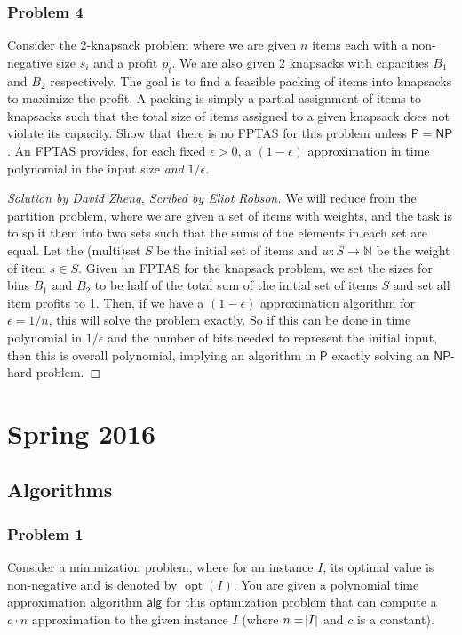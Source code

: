 \documentclass{article}
\newenvironment{scribed}[2]{\begin{proof}[Solution by #1, Scribed by #2]}{\end{proof}}
\newcommand{\NP}{\mathsf{NP}}
\newcommand{\Pe}{\mathsf{P}}
\newcommand{\Naturals}{\mathbb{N}}
\DeclareMathOperator{\opt}{opt}
\begin{document}
\subsubsection{Problem 4}
Consider the 2-knapsack problem where we are given \(n\) items each with a non-negative size \(s_i\) and a profit \(p_i\). We are also given 2 knapsacks with capacities \(B_1\) and \(B_2\) respectively. The goal is to find a feasible packing of items into knapsacks to maximize the profit. A packing is simply a partial assignment of items to knapsacks such that the total size of items assigned to a given knapsack does not violate its capacity. Show that there is no FPTAS for this problem unless \(\Pe = \NP\). An FPTAS provides, for each fixed \(\epsilon > 0\), a \((1 - \epsilon)\) approximation in time polynomial in the input size \emph{and} \(1 / \epsilon\).


\begin{scribed}{David Zheng}{Eliot Robson}
	We will reduce from the partition problem, where we are given a set of items with weights, and the task is to split them into two sets such that the sums of the elements in each set are equal. Let the (multi)set \(S\) be the initial set of items and \(w : S \to \Naturals\) be the weight of item \(s \in S\). Given an FPTAS for the knapsack problem, we set the sizes for bins \(B_1\) and \(B_2\) to be half of the total sum of the initial set of items \(S\) and set all item profits to 1. Then, if we have a \((1 - \epsilon)\) approximation algorithm for \(\epsilon = 1/n\), this will solve the problem exactly. So if this can be done in time polynomial in \(1/\epsilon\) and the number of bits needed to represent the initial input, then this is overall polynomial, implying an algorithm in \(\Pe\) exactly solving an \(\NP\)-hard problem.
\end{scribed}

\section{Spring 2016}

\subsection{Algorithms}

\subsubsection{Problem 1}
Consider a minimization problem, where for an instance \(I\), its optimal value is non-negative and is denoted by \(\opt(I)\). You are given a polynomial time approximation algorithm \(\mathsf{alg}\) for this optimization problem that can compute a \(c \cdot n\) approximation to the given instance \(I\) (where \(n = \abs{I}\) and \(c\) is a constant).
\end{document}
